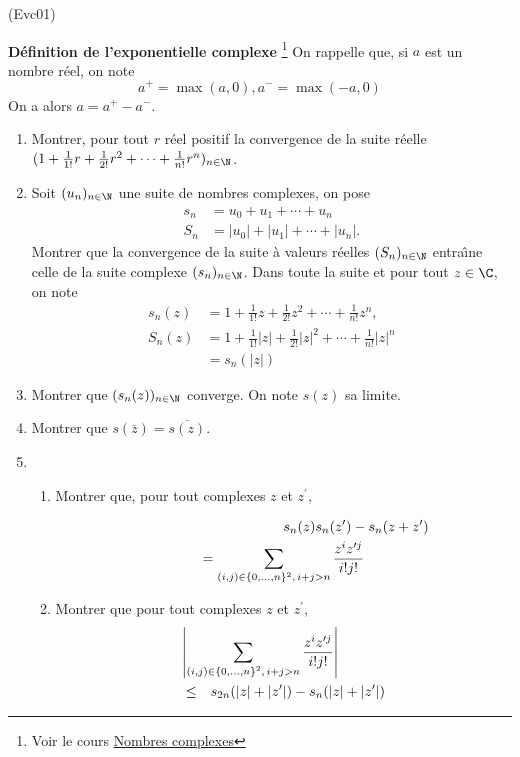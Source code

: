 \begin{tiny}(Evc01)\end{tiny}
\textbf{Définition de l'exponentielle complexe}
\footnote{Voir le cours  \href{http://back.maquisdoc.net/data/cours_nicolair/C2002.pdf}{Nombres complexes}}
\newline
On rappelle que, si $a$ est un nombre r{\'e}el, on note $$a^{+}=\max (a,0), a^{-}=\max (-a,0)$$ On a alors $a=a^{+}-a^{-}$.

\begin{enumerate}
  \item Montrer, pour tout $r$ r{\'e}el positif la convergence de la suite r{\'e}elle $(1+\frac{1}{1!}r+\frac{1}{2!}r^{2}+\cdots +\frac{1}{n!} r^{n})_{n\in \N}$.

  \item Soit $(u_{n})_{n\in \N}$ une suite de nombres complexes, on pose
\begin{align*}
s_{n} &= u_{0}+u_{1}+\cdots +u_{n}\\
S_{n} &= | u_{0}|+| u_{1}| +\cdots + |u_{n}|.
\end{align*}
Montrer que la convergence de la suite à valeurs r{\'e}elles $(S_{n})_{n\in \N}$ entra{\^\i}ne celle de la suite complexe $(s_{n})_{n\in \N}$. Dans toute la suite et pour tout $z \in \C$, on note
\begin{align*}
s_n(z) &= 1+\frac 1{1!}z+\frac 1{2!}z^2+\cdots +\frac 1{n!}z^n, \\
S_n(z) &= 1+\frac 1{1!}| z| +\frac 1{2!}| z| ^2+\cdots+\frac 1{n!}| z| ^n\\
&= s_n(| z| )
\end{align*}

  \item Montrer que $(s_{n}(z))_{n\in \N}$ converge. On note $s(z)$ sa limite.

  \item Montrer que $s(\overline{z})=\overline{s(z)}$.
  \item 
  \begin{enumerate}
    \item Montrer que, pour tout complexes $z$ et $z^{\prime }$,

  \begin{multline*}
\lefteqn{s_{n}(z)s_{n}(z^{\prime })-s_{n}(z+z^{\prime })}\\
= \sum_{(i,j)\in \{0,\ldots ,n \}^{2},\, i+j>n } \frac{z^{i}z^{\prime j}}{i!j!}
\end{multline*}

    \item Montrer que pour tout complexes $z$ et $z^{\prime }$,
\begin{eqnarray*}
\lefteqn{\left| \sum_{(i,j)\in \left\{ 0,\ldots ,n\right\} ^{2},\, i+j>n} \frac{z^{i}z^{\prime j}}{i!j!}\right|}\\
&\leq& s_{2n}(| z| +|z^{\prime }| )-s_{n}(| z| +| z^{\prime }| )
\end{eqnarray*}


\end{enumerate}
\end{enumerate}
